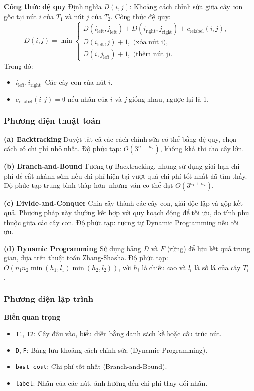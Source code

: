 \documentclass[a4paper,12pt]{article}
\begin{document}
\textbf{Công thức đệ quy}
Định nghĩa \( D(i, j) \): Khoảng cách chỉnh sửa giữa cây con gốc tại nút \( i \) của \( T_1 \) và nút \( j \) của \( T_2 \). Công thức đệ quy:
\[
D(i, j) = \min \begin{cases}
    D(i_{\text{left}}, j_{\text{left}}) + D(i_{\text{right}}, j_{\text{right}}) + c_{\text{relabel}}(i, j), \\
    D(i_{\text{left}}, j) + 1, \text{ (xóa nút i)}, \\
    D(i, j_{\text{left}}) + 1, \text{ (thêm nút j)}.
\end{cases}
\]
Trong đó:
\begin{itemize}
    \item \( i_{\text{left}}, i_{\text{right}} \): Các cây con của nút \( i \).
    \item \( c_{\text{relabel}}(i, j) = 0 \) nếu nhãn của \( i \) và \( j \) giống nhau, ngược lại là 1.
\end{itemize}

\subsubsection{Phương diện thuật toán}

\textbf{(a) Backtracking}
Duyệt tất cả các cách chỉnh sửa có thể bằng đệ quy, chọn cách có chi phí nhỏ nhất. Độ phức tạp: \( O(3^{n_1 + n_2}) \), không khả thi cho cây lớn.

\textbf{(b) Branch-and-Bound}
Tương tự Backtracking, nhưng sử dụng giới hạn chi phí để cắt nhánh sớm nếu chi phí hiện tại vượt quá chi phí tốt nhất đã tìm thấy. Độ phức tạp trung bình thấp hơn, nhưng vẫn có thể đạt \( O(3^{n_1 + n_2}) \).

\textbf{(c) Divide-and-Conquer}
Chia cây thành các cây con, giải độc lập và gộp kết quả. Phương pháp này thường kết hợp với quy hoạch động để tối ưu, do tính phụ thuộc giữa các cây con. Độ phức tạp: tương tự Dynamic Programming nếu tối ưu.

\textbf{(d) Dynamic Programming}
Sử dụng bảng \( D \) và \( F \) (rừng) để lưu kết quả trung gian, dựa trên thuật toán Zhang-Shasha. Độ phức tạp: \( O(n_1 n_2 \min(h_1, l_1) \min(h_2, l_2)) \), với \( h_i \) là chiều cao và \( l_i \) là số lá của cây \( T_i \).

\subsubsection{Phương diện lập trình}

\textbf{Biến quan trọng}
\begin{itemize}
    \item \texttt{T1}, \texttt{T2}: Cây đầu vào, biểu diễn bằng danh sách kề hoặc cấu trúc nút.
    \item \texttt{D}, \texttt{F}: Bảng lưu khoảng cách chỉnh sửa (Dynamic Programming).
    \item \texttt{best\_cost}: Chi phí tốt nhất (Branch-and-Bound).
    \item \texttt{label}: Nhãn của các nút, ảnh hưởng đến chi phí thay đổi nhãn.
\end{itemize}
\end{document}
